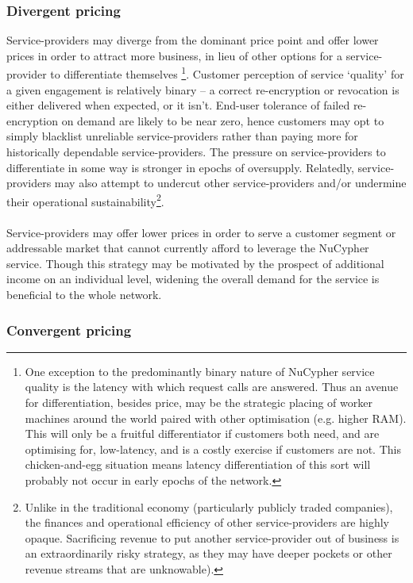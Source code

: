 \documentclass[longbibliography,nofootinbib]{revtex4-1}
\begin{document}
\subsubsection{Divergent pricing}

Service-providers may diverge from the dominant price point and offer lower prices in order to attract more business, in lieu of other options for a service-provider to differentiate themselves \footnote{One exception to the predominantly binary nature of NuCypher service quality is the latency with which request calls are answered. Thus an avenue for differentiation, besides price, may be the strategic placing of worker machines around the world paired with other optimisation (e.g. higher RAM). This will only be a fruitful differentiator if customers both need, and are optimising for, low-latency, and is a costly exercise if customers are not. This chicken-and-egg situation means latency differentiation of this sort will probably not occur in early epochs of the network.}. Customer perception of service ‘quality’ for a given engagement is relatively binary – a correct re-encryption or revocation is either delivered when expected, or it isn't. End-user tolerance of failed re-encryption on demand are likely to be near zero, hence customers may opt to simply blacklist unreliable service-providers rather than paying more for historically dependable service-providers. The pressure on service-providers to differentiate in some way is stronger in epochs of oversupply. Relatedly, service-providers may also attempt to undercut other service-providers and/or undermine their operational sustainability\footnote{Unlike in the traditional economy (particularly publicly traded companies), the finances and operational efficiency of other service-providers are highly opaque. Sacrificing revenue to put another service-provider out of business is an extraordinarily risky strategy, as they may have deeper pockets or other revenue streams that are unknowable).}.
\\\\
Service-providers may offer lower prices in order to serve a customer segment or addressable market that cannot currently afford to leverage the NuCypher service. Though this strategy may be motivated by the prospect of additional income on an individual level, widening the overall demand for the service is beneficial to the whole network. 

\subsubsection{Convergent pricing}
\end{document}
